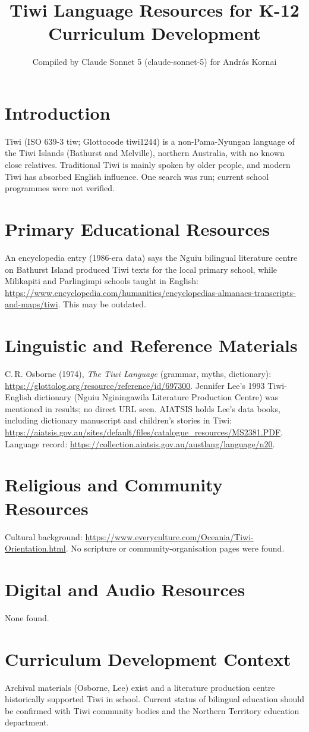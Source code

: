 \documentclass[12pt]{article}
\title{Tiwi Language Resources for K-12 Curriculum Development}
\author{Compiled by Claude Sonnet 5 (claude-sonnet-5) for Andr\'as Kornai}
\date{}
\begin{document}
\maketitle
\section{Introduction}
Tiwi (ISO 639-3 tiw; Glottocode tiwi1244) is a non-Pama-Nyungan language of the Tiwi Islands (Bathurst and Melville), northern Australia, with no known close relatives. Traditional Tiwi is mainly spoken by older people, and modern Tiwi has absorbed English influence. One search was run; current school programmes were not verified.
\section{Primary Educational Resources}
An encyclopedia entry (1986-era data) says the Nguiu bilingual literature centre on Bathurst Island produced Tiwi texts for the local primary school, while Milikapiti and Parlingimpi schools taught in English: \url{https://www.encyclopedia.com/humanities/encyclopedias-almanacs-transcripts-and-maps/tiwi}. This may be outdated.
\section{Linguistic and Reference Materials}
C.\,R. Osborne (1974), \emph{The Tiwi Language} (grammar, myths, dictionary): \url{https://glottolog.org/resource/reference/id/697300}. Jennifer Lee's 1993 Tiwi-English dictionary (Nguiu Nginingawila Literature Production Centre) was mentioned in results; no direct URL seen. AIATSIS holds Lee's data books, including dictionary manuscript and children's stories in Tiwi: \url{https://aiatsis.gov.au/sites/default/files/catalogue_resources/MS2381.PDF}. Language record: \url{https://collection.aiatsis.gov.au/austlang/language/n20}.
\section{Religious and Community Resources}
Cultural background: \url{https://www.everyculture.com/Oceania/Tiwi-Orientation.html}. No scripture or community-organisation pages were found.
\section{Digital and Audio Resources}
None found.
\section{Curriculum Development Context}
Archival materials (Osborne, Lee) exist and a literature production centre historically supported Tiwi in school. Current status of bilingual education should be confirmed with Tiwi community bodies and the Northern Territory education department.
\end{document}
